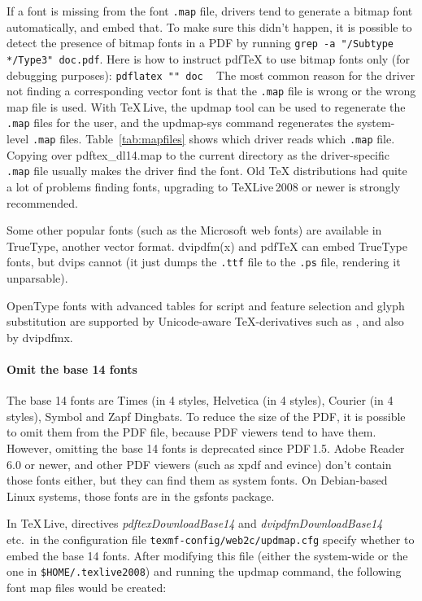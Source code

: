 \documentclass{ltugproc}
\def\cmd{\textsf}
\def\pkg{\textsf}
\begin{document}
If a font is missing from the font \texttt{.map} file, dri\-vers tend to
generate a bitmap font automatically, and embed that. To make sure this
didn't happen, it is possible to detect the presence of bitmap fonts in a PDF
by running \texttt{grep -a "/Subtype */Type3" doc.pdf}. Here is how to
instruct pdf\TeX{} to use bitmap fonts only (for debugging purposes):
\texttt{pdflatex "\string\pdfmapfile{}\string" doc}%
\ %
The most common
reason for the driver not finding a corresponding vector font is that the
\texttt{.map} file is wrong or the wrong map file is used. With
\TeX{}\,Live, the \cmd{updmap} tool can be used to regenerate the
\texttt{.map} files for the user, and the \cmd{updmap-sys} command
regenerates the system-level \texttt{.map} files. Table~\ref{tab:mapfiles}
shows which driver reads which \texttt{.map} file. Copying over
\pkg{pdftex\_dl14.map} to the current directory as the driver-specific
\texttt{.map} file
usually makes the driver find the font. Old \TeX{} distributions had quite
a lot of problems finding fonts, upgrading to \TeX{}Live\,2008 or newer is
strongly recommended.

Some other popular fonts (such as the Microsoft web fonts) are available in
TrueType, another vector format. \cmd{dvipdfm(x)} and pdf\TeX{} can
embed TrueType fonts, but \cmd{dvips} cannot (it just dumps the
\texttt{.ttf} file to the \texttt{.ps} file, rendering it unparsable).

OpenType fonts with advanced tables for script and feature selection
and glyph substitution are supported by Unicode-aware \TeX{}-derivatives
such as \XeTeX{}, and also by \cmd{dvipdfmx}.

\paragraph{Omit the base 14 fonts} The base 14 fonts are Times (in 4 styles,
Helvetica (in 4 styles), Courier (in 4 styles), Symbol and Zapf Dingbats.
To reduce the size of the PDF, it is possible to omit them from the
PDF file, because PDF viewers tend to have them. However, omitting the base 14
fonts is deprecated since PDF\,1.5. Adobe Reader 6.0 or newer,
and other PDF viewers (such as \cmd{xpdf} and \cmd{evince}) don't contain
those fonts either, but they can find them as system fonts. On Debian-based
Linux systems, those fonts are in the \pkg{gsfonts} package.

In \TeX\,Live, directives \emph{pdftexDownloadBase14} and
\emph{dvipdfmDownloadBase14} etc.\ in the configuration file
\texttt{texmf-config/web2c/updmap.cfg} specify whether to embed the base 14
fonts. After modifying this file (either the system-wide or the one in
\texttt{\$HOME/.texlive2008}) and running the \cmd{updmap} command, the
following font map files would be created:
\end{document}
